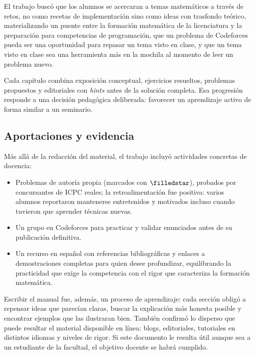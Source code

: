 El trabajo buscó que los alumnos se acercaran a temas matemáticos a través de retos, no como recetas de implementación sino como ideas con trasfondo teórico, materializando un puente entre la formación matemática de la licenciatura y la preparación para competencias de programación, que un problema de Codeforces pueda ser una oportunidad para repasar un tema visto en clase, y que un tema visto en clase sea una herramienta más en la mochila al momento de leer un problema nuevo.
 
Cada capítulo combina exposición conceptual, ejercicios resueltos, problemas propuestos y editoriales con \textit{hints} antes de la solución completa.
Esa progresión responde a una decisión pedagógica deliberada: favorecer un aprendizaje activo de forma similar a un seminario.

\subsection{Aportaciones y evidencia}
Más allá de la redacción del material, el trabajo incluyó actividades concretas de docencia:

\begin{itemize}
    \item Problemas de autoría propia (marcados con $\filledstar$), probados
          por concursantes de ICPC reales; la retroalimentación fue positiva: varios
          alumnos reportaron mantenerse entretenidos y motivados incluso cuando tuvieron que aprender técnicas nuevas.
    \item Un grupo en Codeforces para practicar y validar enunciados antes
          de su publicación definitiva.
    \item Un recurso en español con referencias bibliográficas y enlaces a
          demostraciones completas para quien desee profundizar, equilibrando
          la practicidad que exige la competencia con el rigor que caracteriza
          la formación matemática.
\end{itemize}

Escribir el manual fue, además, un proceso de aprendizaje: cada sección obligó a repensar ideas que parecían claras, buscar la explicación más honesta posible y encontrar ejemplos que las ilustraran bien.
También confirmó lo disperso que puede resultar el material disponible en línea: blogs, editoriales, tutoriales en distintos idiomas y niveles de rigor. Si este documento le resulta útil aunque sea a un estudiante de la facultad, el objetivo docente se habrá cumplido.

